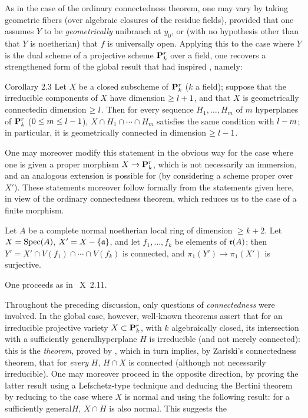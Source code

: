 As in the case of the ordinary connectedness theorem, one may vary  by taking geometric fibers (over algebraic closures of the residue fields), provided that one assumes $Y$ to be \emph{geometrically} unibranch at $y_0$, or (with no hypothesis other than that $Y$ is noetherian) that $f$ is universally open. Applying this to the case where $Y$ is the dual scheme of a projective scheme $\PP_k^r$ over a field, one recovers a strengthened form of the global result that had inspired , namely:

\label{XIII.2.3}
\begin{enonce*}{Corollary 2.3}
Let $X$ be a closed subscheme of $\PP^r_k$ ($k$ a field); suppose that the irreducible components of $X$ have dimension $\ge \sisi{k}{l}+1$, and that $X$ is geometrically connected\pageoriginaled in dimension $\ge \sisi{k}{l}$. Then for every sequence $H_1, \dotsc, H_m$ of $m$ hyperplanes of $\PP^r_k$ ($0\le m\le \sisi{k}{l}-1$), $X\cap H_1\cap \dotsb \cap H_m$ satisfies the same condition with $\sisi{k}{l}-m$; in particular, it is geometrically connected in dimension $\ge \sisi{k}{l}-1$.
\end{enonce*}

One may moreover modify this statement in the
obvious way for the case where one is given a proper morphism
$X \to \PP^r_k$, which is not necessarily an
immersion, and an analogous extension is possible for
 (by considering a scheme proper over~$X'$). These
statements moreover follow formally from the statements given
here, in view of the ordinary connectedness theorem, which
reduces us to the case of a finite morphism.

\begin{corollaire} \label{XIII.2.4}
Let $A$ be a complete normal noetherian local ring of dimension $\ge k+2$. Let $X=\Spec (A)$, $X'=X-\{ \aaa\}$, and let $f_1, \dotsc, f_k$ be elements of $\rr(A)$; then $Y'=X'\cap V(f_1) \cap \dotsb \cap V(f_k)$ is connected, and $\pi_1(Y')\to \pi_1(X')$ is surjective.
\end{corollaire}

One proceeds as in ~X~2.11.

Throughout the preceding discussion, only questions of \emph{connectedness} were involved. In the global case, however, well-known theorems assert that for an irreducible projective variety $X\subset \PP^r_k$, with $k$ algebraically closed, its intersection with a sufficiently \og general\fg hyperplane $H$ is irreducible (and not merely connected): this is the \emph{ theorem}, proved by , which in turn implies, by Zariski's connectedness theorem, that for \emph{every} $H$, $H\cap X$ is connected (although not necessarily irreducible). One may moreover proceed in the opposite direction, by proving the latter result using a Lefschetz-type technique and deducing the Bertini theorem by reducing to the case where $X$ is normal and using the following result: for a \og sufficiently general\fg $H$, $X\cap H$ is also normal. This suggests the

